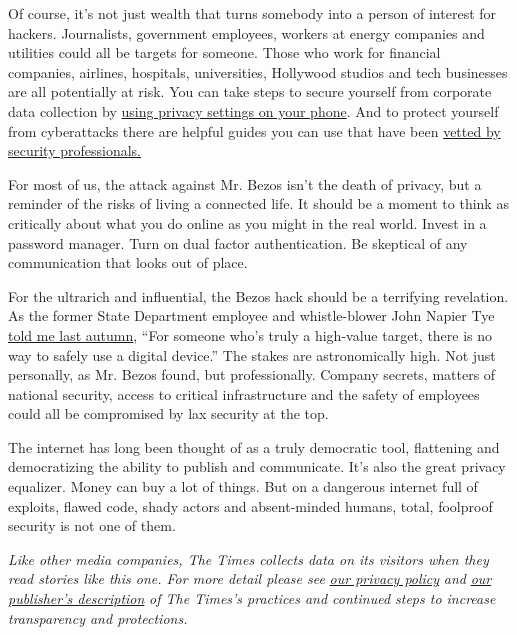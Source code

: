 Of course, it's not just wealth that turns somebody into a person of
interest for hackers. Journalists, government employees, workers at
energy companies and utilities could all be targets for someone. Those
who work for financial companies, airlines, hospitals, universities,
Hollywood studios and tech businesses are all potentially at risk. You
can take steps to secure yourself from corporate data collection by
\href{https://www.nytimes.com/interactive/2019/12/19/opinion/location-tracking-privacy-tips.html}{using
privacy settings on your phone}. And to protect yourself from
cyberattacks there are helpful guides you can use that have been
\href{https://securityplanner.org/\#/tool/advanced-anonymity-security-guides}{vetted
by security professionals.}

For most of us, the attack against Mr. Bezos isn't the death of privacy,
but a reminder of the risks of living a connected life. It should be a
moment to think as critically about what you do online as you might in
the real world. Invest in a password manager. Turn on dual factor
authentication. Be skeptical of any communication that looks out of
place.

For the ultrarich and influential, the Bezos hack should be a terrifying
revelation. As the former State Department employee and whistle-blower
John Napier Tye
\href{https://www.nytimes.com/2019/11/12/opinion/whistleblower.html}{told
me last autumn}, ``For someone who's truly a high-value target, there is
no way to safely use a digital device.'' The stakes are astronomically
high. Not just personally, as Mr. Bezos found, but professionally.
Company secrets, matters of national security, access to critical
infrastructure and the safety of employees could all be compromised by
lax security at the top.

The internet has long been thought of as a truly democratic tool,
flattening and democratizing the ability to publish and communicate.
It's also the great privacy equalizer. Money can buy a lot of things.
But on a dangerous internet full of exploits, flawed code, shady actors
and absent-minded humans, total, foolproof security is not one of them.

\emph{Like other media companies, The Times collects data on its
visitors when they read stories like this one. For more detail please
see}
\href{https://help.nytimes.com/hc/en-us/articles/115014892108-Privacy-policy?module=inline}{\emph{our
privacy policy}} \emph{and}
\href{https://www.nytimes.com/2019/04/10/opinion/sulzberger-new-york-times-privacy.html?rref=collection\%2Fspotlightcollection\%2Fprivacy-project-does-privacy-matter\&action=click\&contentCollection=opinion\&region=stream\&module=stream_unit\&version=latest\&contentPlacement=8\&pgtype=collection}{\emph{our
publisher's description}} \emph{of The Times's practices and continued
steps to increase transparency and protections.}

